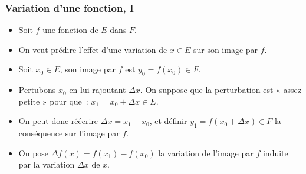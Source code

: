 \documentclass[10pt,notheorems]{beamer}
\theoremstyle{plain}
\theoremstyle{definition} %
\begin{document}
\begin{frame}
  \frametitle{Variation d'une fonction, I}
  \hypertarget{slide_variation_1}{}

  \begin{itemize}

  \item Soit $f$ une fonction de $E$ dans $F$.\newline

  \item On veut prédire l'effet d'une variation de $x\in E$ sur son image par $f$.\newline

  \item Soit $x_0\in E$, son image par $f$ est $y_0 = f(x_0)\in F$.\newline

  \item Pertubons $x_0$ en lui rajoutant $\Delta x$. On suppose que la perturbation est « assez petite » pour que~: $x_1=x_0+\Delta x \in E$.\newline

  \item On peut donc réécrire $\Delta x = x_1-x_0$, et définir $y_1 = f(x_0+\Delta x)\in F$ la conséquence sur l'image par $f$.\newline

  \item On pose $\Delta f(x) = f(x_1)-f(x_0)$ la variation de l'image par $f$ induite par la variation $\Delta x$ de $x$.

  \end{itemize}

\end{frame}
\end{document}
